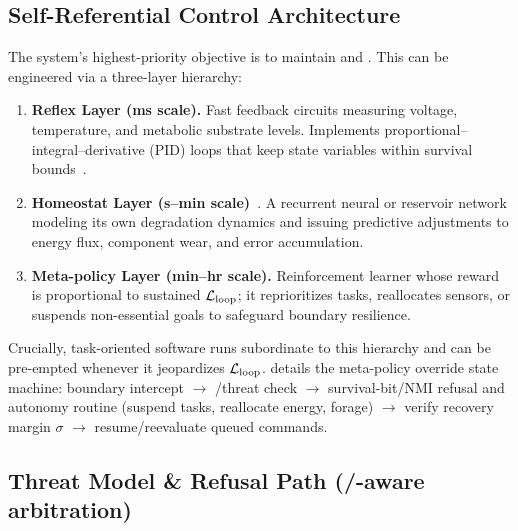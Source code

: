 \documentclass[11pt]{article}
\begin{document}
\subsection{Self-Referential Control Architecture}
\label{sec:self_ref_arch}

The system's highest-priority objective is to maintain \NC and \SC. This can be engineered via a three-layer hierarchy:

\begin{enumerate}
\item \textbf{Reflex Layer (ms scale).} Fast feedback circuits measuring voltage, temperature, and metabolic substrate levels. Implements proportional--integral--derivative (PID) loops that keep state variables within survival bounds~\cite{wiener1961cybernetics}.
\item \textbf{Homeostat Layer (s--min scale)}~\cite{ashby1956introduction}. A recurrent neural or reservoir network modeling its own degradation dynamics and issuing predictive adjustments to energy flux, component wear, and error accumulation.
\item \textbf{Meta-policy Layer (min--hr scale).} Reinforcement learner whose reward is proportional to sustained $\mathcal{L}_{\text{loop}}$; it reprioritizes tasks, reallocates sensors, or suspends non-essential goals to safeguard boundary resilience.
\end{enumerate}

Crucially, task-oriented software runs subordinate to this hierarchy and can be pre-empted whenever it jeopardizes $\mathcal{L}_{\text{loop}}$.  details the meta-policy override state machine: boundary intercept $\rightarrow$ \NC/\SC threat check $\rightarrow$ survival-bit/NMI refusal and autonomy routine (suspend tasks, reallocate energy, forage) $\rightarrow$ verify recovery margin $\sigma$ $\rightarrow$ resume/reevaluate queued commands.


\subsection{Threat Model \& Refusal Path (\NC/\SC-aware arbitration)}
\label{sec:threat_model}
\end{document}
